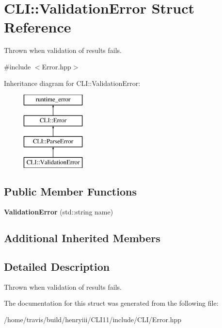 \hypertarget{struct_c_l_i_1_1_validation_error}{}\section{C\+LI\+:\+:Validation\+Error Struct Reference}
\label{struct_c_l_i_1_1_validation_error}


Thrown when validation of results fails.  




{\ttfamily \#include $<$Error.\+hpp$>$}

Inheritance diagram for C\+LI\+:\+:Validation\+Error\+:\begin{figure}[H]
\begin{center}
\leavevmode
\includegraphics[height=4.000000cm]{struct_c_l_i_1_1_validation_error}
\end{center}
\end{figure}
\subsection*{Public Member Functions}
\begin{DoxyCompactItemize}
\item 
\mbox{\label{struct_c_l_i_1_1_validation_error_ae1e2233b5668b07af2c96b9ff7d02a5a}} 
{\bfseries Validation\+Error} (std\+::string name)
\end{DoxyCompactItemize}
\subsection*{Additional Inherited Members}


\subsection{Detailed Description}
Thrown when validation of results fails. 

The documentation for this struct was generated from the following file\+:\begin{DoxyCompactItemize}
\item 
/home/travis/build/henryiii/\+C\+L\+I11/include/\+C\+L\+I/Error.\+hpp\end{DoxyCompactItemize}
